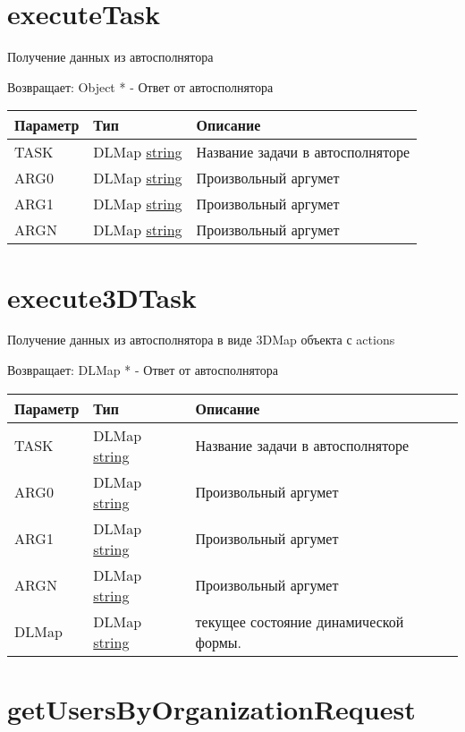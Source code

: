 \hypertarget{executetasktask-arg0-arg1-argn-object}{%
\section{executeTask}\label{executetasktask-arg0-arg1-argn-object}}

Получение данных из автосполнятора

Возвращает: Object \textbar{} * - Ответ от автосполнятора

\begin{longtable}[]{@{}lll@{}}
\toprule
Параметр & Тип & Описание\tabularnewline
\midrule
\endhead
TASK & DLMap \textbar{} \protect\hyperlink{string}{string} & Название
задачи в автосполняторе\tabularnewline
ARG0 & DLMap \textbar{} \protect\hyperlink{string}{string} &
Произвольный аргумет\tabularnewline
ARG1 & DLMap \textbar{} \protect\hyperlink{string}{string} &
Произвольный аргумет\tabularnewline
ARGN & DLMap \textbar{} \protect\hyperlink{string}{string} &
Произвольный аргумет\tabularnewline
\bottomrule
\end{longtable}

\section{execute3DTask
\label{execute3dtasktask-arg0-arg1-argn-dlmap-object}}
Получение данных из автосполнятора в виде 3DMap объекта с actions

Возвращает: DLMap \textbar{} * - Ответ от автосполнятора

\begin{longtable}[]{@{}lll@{}}
\toprule
Параметр & Тип & Описание\tabularnewline
\midrule
\endhead
TASK & DLMap \textbar{} \protect\hyperlink{string}{string} & Название
задачи в автосполняторе\tabularnewline
ARG0 & DLMap \textbar{} \protect\hyperlink{string}{string} &
Произвольный аргумет\tabularnewline
ARG1 & DLMap \textbar{} \protect\hyperlink{string}{string} &
Произвольный аргумет\tabularnewline
ARGN & DLMap \textbar{} \protect\hyperlink{string}{string} &
Произвольный аргумет\tabularnewline
DLMap & DLMap \textbar{} \protect\hyperlink{string}{string} &
текущее состояние динамической формы.\tabularnewline
\bottomrule
\end{longtable}

\hypertarget{getusersbyorganizationrequestrealtyobj-text-object}{%
\section{getUsersByOrganizationRequest}\label{getusersbyorganizationrequestrealtyobj-text-object}}


